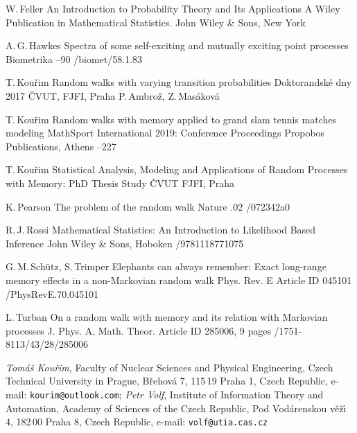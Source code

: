 \by W.\,Feller
\book An Introduction to Probability Theory and Its Applications
\publ A Wiley Publication in Mathematical Statistics. John Wiley \& Sons, New York 

\by A.\,G.\,Hawkes
\paper Spectra of some self-exciting and mutually exciting point processes
\jour Biometrika
  --90
/biomet/58.1.83

\by T.\,Kou\v rim
\paper Random walks with varying transition probabilities
\inbook Doktorandsk\'e dny 2017
\publ \v CVUT, FJFI, Praha 
\eds P.\,Ambro\v z, Z.\,Mas\'akov\'a

\by T.\,Kou\v rim
\paper Random walks with memory applied to grand slam tennis matches modeling
\inbook MathSport International 2019: Conference Proceedings
\publ Propobos Publications, Athens 
--227

\by T.\,Kou\v rim
\book Statistical Analysis, Modeling and Applications of Random Processes with Memory: PhD Thesis Study
\publ \v CVUT FJFI, Praha 


\by K.\,Pearson
\paper The problem of the random walk
\jour Nature
  
.02
/072342a0

\by R.\,J.\,Rossi
\book Mathematical Statistics: An Introduction to Likelihood Based Inference
\publ John Wiley \& Sons, Hoboken 
/9781118771075

\by G.\,M.\,Sch\"utz, S.\,Trimper
\paper Elephants can always remember: Exact long-range memory effects in a non-Markovian random walk
\jour Phys. Rev. E
  \pages Article ID 045101
/PhysRevE.70.045101

\by L.\,Turban
\paper On a random walk with memory and its relation with Markovian processes
\jour J. Phys. A, Math. Theor.
  \pages Article ID 285006, 9 pages
/1751-8113/43/28/285006


\adresy
{\it Tom\'a\v{s} Kou\v rim}, Faculty of Nuclear Sciences and Physical Engineering, Czech Technical University in Prague,
B\v rehov\'a 7, 115\,19 Praha 1,
Czech Republic,
e-mail: {\tt kourim@outlook.com};
{\em Petr Volf}, Institute of Information Theory and Automation, Academy of Sciences of the Czech Republic,
Pod Vod\'arenskou v\v e\v z\'{\i} 4, 182\,00 Praha 8,
Czech Republic,
e-mail: {\tt volf@utia.cas.cz}



\bye
